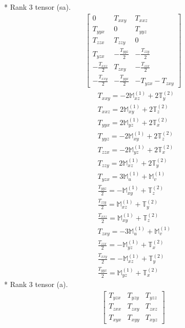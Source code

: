 \documentclass[fleqn,8pt,landscape]{jsarticle}
\begin{document}
* Rank 3 tensor (sa).
\begin{align*}
\begin{bmatrix} 0 & T_{xxy} & T_{xxz} \\ T_{yyx} & 0 & T_{yyz} \\ T_{zzx} & T_{zzy} & 0 \\ T_{yzx} & - \frac{T_{yyz}}{2} & - \frac{T_{zzy}}{2} \\ - \frac{T_{xxz}}{2} & T_{zxy} & - \frac{T_{zzx}}{2} \\ - \frac{T_{xxy}}{2} & - \frac{T_{yyx}}{2} & - T_{yzx} - T_{zxy} \end{bmatrix}
\end{align*}
\begin{align*}
& T_{xxy} = - 2 \mathbb{M}_{xz}^{(1)} + 2 \mathbb{T}_{y}^{(2)} \\
& T_{xxz} = 2 \mathbb{M}_{xy}^{(1)} + 2 \mathbb{T}_{z}^{(2)} \\
& T_{yyx} = 2 \mathbb{M}_{yz}^{(1)} + 2 \mathbb{T}_{x}^{(2)} \\
& T_{yyz} = - 2 \mathbb{M}_{xy}^{(1)} + 2 \mathbb{T}_{z}^{(2)} \\
& T_{zzx} = - 2 \mathbb{M}_{yz}^{(1)} + 2 \mathbb{T}_{x}^{(2)} \\
& T_{zzy} = 2 \mathbb{M}_{xz}^{(1)} + 2 \mathbb{T}_{y}^{(2)} \\
& T_{yzx} = 3 \mathbb{M}_{u}^{(1)} + \mathbb{M}_{v}^{(1)} \\
& \frac{T_{yyz}}{2} = - \mathbb{M}_{xy}^{(1)} + \mathbb{T}_{z}^{(2)} \\
& \frac{T_{zzy}}{2} = \mathbb{M}_{xz}^{(1)} + \mathbb{T}_{y}^{(2)} \\
& \frac{T_{xxz}}{2} = \mathbb{M}_{xy}^{(1)} + \mathbb{T}_{z}^{(2)} \\
& T_{zxy} = - 3 \mathbb{M}_{u}^{(1)} + \mathbb{M}_{v}^{(1)} \\
& \frac{T_{zzx}}{2} = - \mathbb{M}_{yz}^{(1)} + \mathbb{T}_{x}^{(2)} \\
& \frac{T_{xxy}}{2} = - \mathbb{M}_{xz}^{(1)} + \mathbb{T}_{y}^{(2)} \\
& \frac{T_{yyx}}{2} = \mathbb{M}_{yz}^{(1)} + \mathbb{T}_{x}^{(2)}
\end{align*}
* Rank 3 tensor (a).
\begin{align*}
\begin{bmatrix} T_{yzx} & T_{yzy} & T_{yzz} \\ T_{zxx} & T_{zxy} & T_{zxz} \\ T_{xyx} & T_{xyy} & T_{xyz} \end{bmatrix}
\end{align*}
\end{document}
